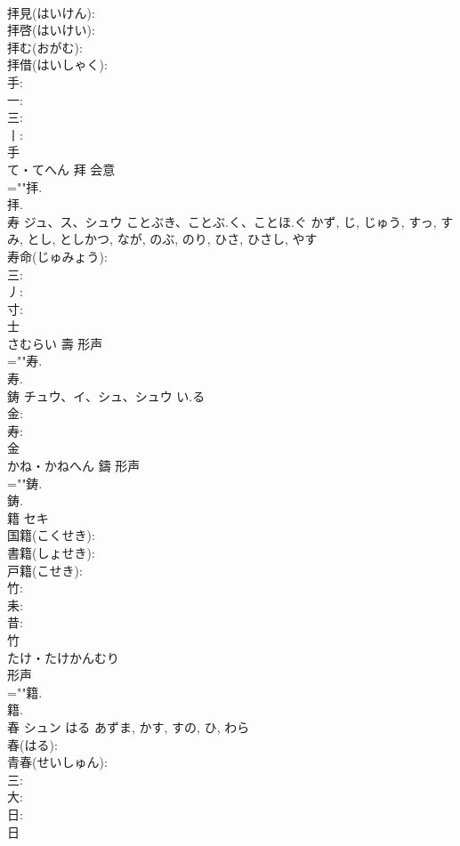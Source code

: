 \documentclass[8pt]{extreport}
\begin{document}
\begin{CJK}{UTF8}{min}
\\	拝見(はいけん): 
\\	拝啓(はいけい): 
\\	拝む(おがむ): 
\\	拝借(はいしゃく): 
\\	手: 
\\	一: 
\\	三: 
\\	丨: 
\\	手	
\\	て・てへん	拜	会意 
\\	=""拝.
\\	拝.
\\	寿	ジュ、ス、シュウ	ことぶき、ことぶ.く、ことほ.ぐ	かず, じ, じゅう, すっ, すみ, とし, としかつ, なが, のぶ, のり, ひさ, ひさし, やす	
\\	寿命(じゅみょう): 
\\	三: 
\\	丿: 
\\	寸: 
\\	士	
\\	さむらい	壽	形声 
\\	=""寿.
\\	寿.
\\	鋳	チュウ、イ、シュ、シュウ	い.る		
\\	金: 
\\	寿: 
\\	金	
\\	かね・かねへん	鑄	形声 
\\	=""鋳.
\\	鋳.
\\	籍	セキ			
\\	国籍(こくせき): 
\\	書籍(しょせき): 
\\	戸籍(こせき): 
\\	竹: 
\\	耒: 
\\	昔: 
\\	竹	
\\	たけ・たけかんむり	
\\	形声 
\\	=""籍.
\\	籍.
\\	春	シュン	はる	あずま, かす, すの, ひ, わら	
\\	春(はる): 
\\	青春(せいしゅん): 
\\	三: 
\\	大: 
\\	日: 
\\	日	

\end{CJK}
\end{document}
